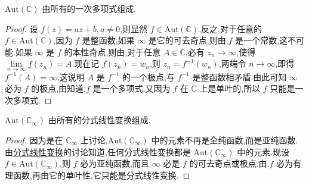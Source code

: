 \documentclass[../../main.tex]{subfiles}%
\begin{document}
\begin{theorem}\label{theorem:定理5.3.4}
\( \mathrm{Aut}(\mathbb{C}) \) 由所有的一次多项式组成.
\end{theorem}
\begin{proof}

设 \( f(z) = az + b, a \neq 0 \),则显然 \( f \in \mathrm{Aut}(\mathbb{C}) \).反之,对于任意的 \( f \in \mathrm{Aut}(\mathbb{C}) \),因为 \( f \) 是整函数,如果 \( \infty \) 是它的可去奇点,则由,\( f \) 是一个常数,这不可能.如果 \( \infty \) 是 \( f \) 的本性奇点,则由,对于任意 \( A \in \mathbb{C} \),必有 \( z_n \to \infty \),使得 \( \lim\limits_{n \to \infty} f(z_n) = A \).现在记 \( f(z_n) = w_n \),则 \( z_n = f^{-1}(w_n) \),两端令 \( n \to \infty \),即得 \( f^{-1}(A) = \infty \).这说明 \( A \) 是 \( f^{-1} \) 的一个极点,与 \( f^{-1} \) 是整函数相矛盾.由此可知 \( \infty \) 必为 \( f \) 的极点,由知道,\( f \) 是一个多项式.又因为 \( f \) 在 \( \mathbb{C} \) 上是单叶的,所以 \( f \) 只能是一次多项式.

\end{proof}

\begin{theorem}\label{theorem:定理5.3.5}
\( \mathrm{Aut}(\mathbb{C}_{\infty}) \) 由所有的分式线性变换组成.
\end{theorem}
\begin{proof}

因为是在 \( \mathbb{C}_{\infty} \) 上讨论,\( \mathrm{Aut}(\mathbb{C}_{\infty}) \) 中的元素不再是全纯函数,而是亚纯函数.由\hyperref[section:2.2.5]{分式线性变换}的讨论知道,任何分式线性变换都是 \( \mathrm{Aut}(\mathbb{C}_{\infty}) \) 中的元素.现设 \( f \in \mathrm{Aut}(\mathbb{C}_{\infty}) \),则 \( f \) 必为亚纯函数,而且 \( \infty \) 必是 \( f \) 的可去奇点或极点.由,\( f \) 必为有理函数,再由它的单叶性,它只能是分式线性变换.

\end{proof}
\end{document}
